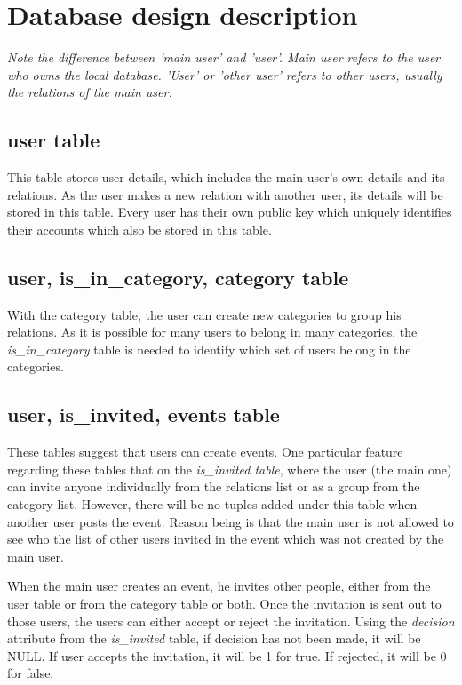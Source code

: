 \section{Database design description}
{\it Note the difference between 'main user' and 'user'. Main user refers to the 
user who owns the local database. 'User' or 'other user' refers to other users, 
usually the relations of the main user.}

\subsection{user table} 
This table stores user details, which includes the main user's own details and 
its relations. As the user makes a new relation with another user, its details 
will be stored in this table. Every user has their own public key which uniquely 
identifies their accounts which also be stored in this table.

\subsection{user, is\_in\_category, category table}
With the category table, the user can create new categories to group his 
relations. As it is possible for many users to belong in many categories, the 
{\it is\_in\_category} table is needed to identify which set of users belong in 
the categories.

\subsection{user, is\_invited, events table}
These tables suggest that users can create events. One particular feature 
regarding these tables that on the {\it is\_invited table}, where the user (the 
main one) can invite anyone individually from the relations list or as a group 
from the category list. However, there will be no tuples added under this table 
when another user posts the event. Reason being is that the main user is not 
allowed to see who the list of other users invited in the event which was not 
created by the main user. 

When the main user creates an event, he invites other people, either from the 
user table or from the category table or both. Once the invitation is sent out 
to those users, the users can either accept or reject the invitation. Using the 
{\it decision} attribute from the {\it is\_invited} table, if decision has not 
been made, it will be NULL. If user accepts the invitation, it will be 1 for 
true. If rejected, it will be 0 for false. 

